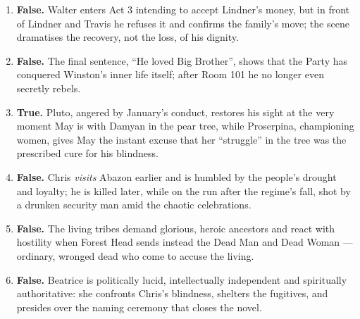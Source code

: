 \documentclass[11pt]{article}
\begin{document}
\begin{corrige}
\begin{enumerate}
\item \textbf{False.} Walter enters Act 3 intending to accept Lindner's money, but in front of Lindner and Travis he refuses it and confirms the family's move; the scene dramatises the recovery, not the loss, of his dignity.
\item \textbf{False.} The final sentence, ``He loved Big Brother'', shows that the Party has conquered Winston's inner life itself; after Room 101 he no longer even secretly rebels.
\item \textbf{True.} Pluto, angered by January's conduct, restores his sight at the very moment May is with Damyan in the pear tree, while Proserpina, championing women, gives May the instant excuse that her ``struggle'' in the tree was the prescribed cure for his blindness.
\item \textbf{False.} Chris \emph{visits} Abazon earlier and is humbled by the people's drought and loyalty; he is killed later, while on the run after the regime's fall, shot by a drunken security man amid the chaotic celebrations.
\item \textbf{False.} The living tribes demand glorious, heroic ancestors and react with hostility when Forest Head sends instead the Dead Man and Dead Woman --- ordinary, wronged dead who come to accuse the living.
\item \textbf{False.} Beatrice is politically lucid, intellectually independent and spiritually authoritative: she confronts Chris's blindness, shelters the fugitives, and presides over the naming ceremony that closes the novel.
\end{enumerate}
\end{corrige}
\end{document}
